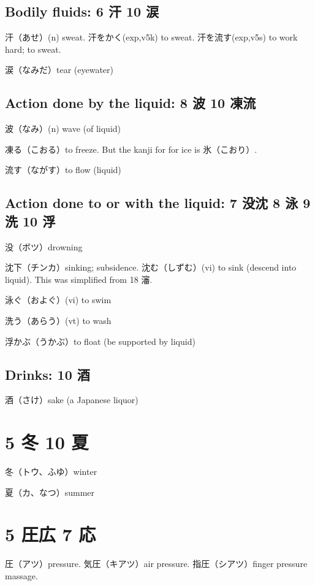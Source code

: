 \subsection{Bodily fluids: 6 汗 10 涙}

汗（あせ）(n) sweat.
汗をかく(exp,v5k) to sweat.
汗を流す(exp,v5s) to work hard; to sweat.

涙（なみだ）tear (eyewater)

\subsection{Action done by the liquid: 8 波 10 凍流}

波（なみ）(n) wave (of liquid)

凍る（こおる）to freeze.
But the kanji for for ice is 氷（こおり）.

流す（ながす）to flow (liquid)

\subsection{Action done to or with the liquid: 7 没沈 8 泳 9 洗 10 浮}

没（ボツ）drowning

沈下（チンカ）sinking; subsidence.
沈む（しずむ）(vi) to sink (descend into liquid).
This was simplified from 18 瀋.

泳ぐ（およぐ）(vi) to swim

洗う（あらう）(vt) to wash

浮かぶ（うかぶ）to float (be supported by liquid)

\subsection{Drinks: 10 酒}

酒（さけ）sake (a Japanese liquor)

\section{5 冬 10 夏}

冬（トウ、ふゆ）winter

夏（カ、なつ）summer

\section{5 圧広 7 応}

圧（アツ）pressure.
気圧（キアツ）air pressure.
指圧（シアツ）finger pressure massage.

